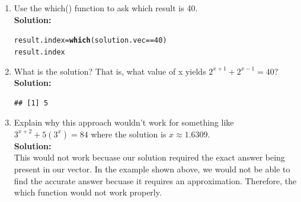 \documentclass{article}\usepackage[]{graphicx}\usepackage[]{xcolor}
\makeatletter
\newcommand{\hlnum}[1]{\textcolor[rgb]{0.686,0.059,0.569}{#1}}%
\newcommand{\hlopt}[1]{\textcolor[rgb]{0,0,0}{#1}}%
\newcommand{\hldef}[1]{\textcolor[rgb]{0.345,0.345,0.345}{#1}}%
\newcommand{\hlkwb}[1]{\textcolor[rgb]{0.69,0.353,0.396}{#1}}%
\newcommand{\hlkwd}[1]{\textcolor[rgb]{0.737,0.353,0.396}{\textbf{#1}}}%
\newenvironment{kframe}{%
 \def\at@end@of@kframe{}%
 \ifinner\ifhmode%
  \def\at@end@of@kframe{\end{minipage}}%
  \begin{minipage}{\columnwidth}%
 \fi\fi%
 \def\FrameCommand##1{\hskip\@totalleftmargin \hskip-\fboxsep
 \colorbox{shadecolor}{##1}\hskip-\fboxsep
     \hskip-\linewidth \hskip-\@totalleftmargin \hskip\columnwidth}%
 \MakeFramed {\advance\hsize-\width
   \@totalleftmargin\z@ \linewidth\hsize
   \@setminipage}}%
 {\par\unskip\endMakeFramed%
 \at@end@of@kframe}
\newenvironment{knitrout}{}{} %
\makeatother
\begin{document}
\begin{enumerate}
\begin{enumerate}
  \item Use the which() function to ask which result is 40.\\
\textbf{Solution:}
\begin{knitrout}\scriptsize
{}\color{fgcolor}\begin{kframe}
\begin{alltt}
\hldef{result.index} \hlkwb{=} \hlkwd{which}\hldef{(solution.vec} \hlopt{==} \hlnum{40}\hldef{)}
\hldef{result.index}
\end{alltt}
\end{kframe}
\end{knitrout}
  \item What is the solution? That is, what value of x yields $2^{x+1} +2^{x-1} = 40$?\\
\textbf{Solution:}
\begin{knitrout}\scriptsize
{}\color{fgcolor}\begin{kframe}
\begin{verbatim}
## [1] 5
\end{verbatim}
\end{kframe}
\end{knitrout}
  \item Explain why this approach wouldn't work for something like $3^{x+2} + 5 (3^x) = 84$ where the solution is $x \approx 1.6309$.\\
\textbf{Solution:}
\\
This would not work becuase our solution required the exact answer being present in our vector. In the example shown above, we would not be able to find the accurate answer becuase it requires an approximation. Therefore, the which function would not work properly.
\end{enumerate}
\end{enumerate}
\end{document}

